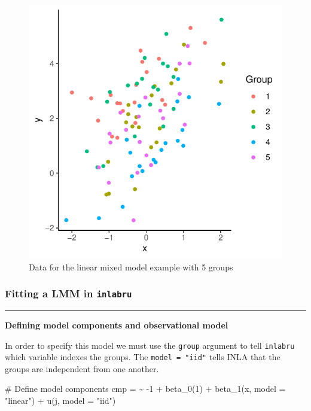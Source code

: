 \documentclass[
  letterpaper,
  DIV=11,
  numbers=noendperiod]{scrartcl}
\newenvironment{Shaded}{\begin{snugshade}}{\end{snugshade}}
\newcommand{\AttributeTok}[1]{\textcolor[rgb]{0.40,0.45,0.13}{#1}}
\newcommand{\CommentTok}[1]{\textcolor[rgb]{0.37,0.37,0.37}{#1}}
\newcommand{\DecValTok}[1]{\textcolor[rgb]{0.68,0.00,0.00}{#1}}
\newcommand{\ErrorTok}[1]{\textcolor[rgb]{0.68,0.00,0.00}{#1}}
\newcommand{\FunctionTok}[1]{\textcolor[rgb]{0.28,0.35,0.67}{#1}}
\newcommand{\NormalTok}[1]{\textcolor[rgb]{0.00,0.23,0.31}{#1}}
\newcommand{\OtherTok}[1]{\textcolor[rgb]{0.00,0.23,0.31}{#1}}
\newcommand{\SpecialCharTok}[1]{\textcolor[rgb]{0.37,0.37,0.37}{#1}}
\newcommand{\StringTok}[1]{\textcolor[rgb]{0.13,0.47,0.30}{#1}}
\begin{document}
\begin{figure}[H]

{\centering \includegraphics{day1_practical_files/figure-pdf/plot_data_lmm-1.pdf}

}

\caption{Data for the linear mixed model example with 5 groups}

\end{figure}%

\subsubsection{\texorpdfstring{Fitting a LMM in
\texttt{inlabru}}{Fitting a LMM in inlabru}}\label{fitting-a-lmm-in-inlabru}

\begin{center}\rule{0.5\linewidth}{0.5pt}\end{center}

\textbf{Defining model components and observational model}

In order to specify this model we must use the \texttt{group} argument
to tell \texttt{inlabru} which variable indexes the groups. The
\texttt{model\ =\ "iid"} tells INLA that the groups are independent from
one another.

\begin{Shaded}
\begin{Highlighting}[]
\CommentTok{\# Define model components}
\NormalTok{cmp }\OtherTok{=}  \ErrorTok{\textasciitilde{}} \SpecialCharTok{{-}}\DecValTok{1} \SpecialCharTok{+} \FunctionTok{beta\_0}\NormalTok{(}\DecValTok{1}\NormalTok{) }\SpecialCharTok{+} \FunctionTok{beta\_1}\NormalTok{(x, }\AttributeTok{model =} \StringTok{"linear"}\NormalTok{) }\SpecialCharTok{+}
  \FunctionTok{u}\NormalTok{(j, }\AttributeTok{model =} \StringTok{"iid"}\NormalTok{)}
\end{Highlighting}
\end{Shaded}
\end{document}
